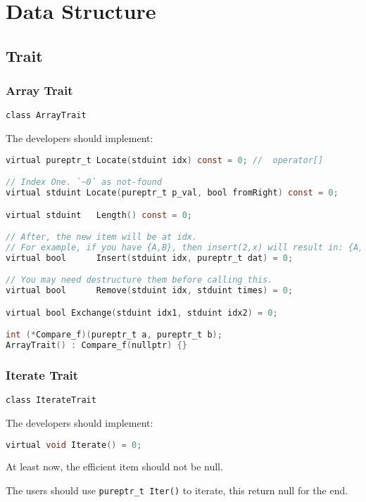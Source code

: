 
\section{Data Structure}

\subsection{Trait}

\subsubsection{Array Trait}

\verb|class ArrayTrait|

The developers should implement:

\lstset{style=GlobalC}
\begin{lstlisting}[language=C]
virtual pureptr_t Locate(stduint idx) const = 0; //  operator[]

// Index One. `~0` as not-found
virtual stduint Locate(pureptr_t p_val, bool fromRight) const = 0;

virtual stduint   Length() const = 0;

// After, the new item will be at idx.
// For example, if you have {A,B}, then insert(2,x) will result in: {A,B,x}
virtual bool      Insert(stduint idx, pureptr_t dat) = 0;

// You may need destructure them before calling this.
virtual bool      Remove(stduint idx, stduint times) = 0;

virtual bool Exchange(stduint idx1, stduint idx2) = 0;

int (*Compare_f)(pureptr_t a, pureptr_t b);
ArrayTrait() : Compare_f(nullptr) {}
\end{lstlisting}

\subsubsection{Iterate Trait}

\verb|class IterateTrait|

The developers should implement:

\lstset{style=GlobalC}
\begin{lstlisting}[language=C]
virtual void Iterate() = 0;
\end{lstlisting}

At least now, the efficient item should not be null.

The users should use \verb|pureptr_t Iter()| to iterate, this return null for the end.

